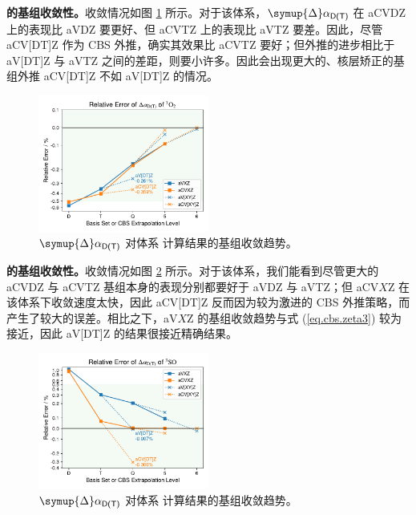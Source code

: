 \textbf{ 的基组收敛性。}收敛情况如图 \ref{fig.O2-iso} 所示。对于该体系，$\symup{\Delta} \alpha_\textsf{D(T)}$ 在 aCVDZ 上的表现比 aVDZ 要更好、但 aCVTZ 上的表现比 aVTZ 要差。因此，尽管 aCV[DT]Z 作为 CBS 外推，确实其效果比 aCVTZ 要好；但外推的进步相比于 aV[DT]Z 与 aVTZ 之间的差距，则要小许多。因此会出现更大的、核层矫正的基组外推 aCV[DT]Z 不如 aV[DT]Z 的情况。

\begin{figure}[!ht]
    \centering
    \includegraphics[width=0.5\textwidth]{assets/O2-iso.pdf}
    \caption[$\symup{\Delta} \alpha_\textsf{D(T)}$ 对体系  计算结果的基组收敛趋势]{$\symup{\Delta} \alpha_\textsf{D(T)}$ 对体系  计算结果的基组收敛趋势。}
    \label{fig.O2-iso}
\end{figure}

\textbf{ 的基组收敛性。}收敛情况如图 \ref{fig.SO-iso} 所示。对于该体系，我们能看到尽管更大的 aCVDZ 与 aCVTZ 基组本身的表现分别都要好于 aVDZ 与 aVTZ；但 aCV$X$Z 在该体系下收敛速度太快，因此 aCV[DT]Z 反而因为较为激进的 CBS 外推策略，而产生了较大的误差。相比之下，aV$X$Z 的基组收敛趋势与式 (\ref{eq.cbs.zeta3}) 较为接近，因此 aV[DT]Z 的结果很接近精确结果。

\begin{figure}[!ht]
    \centering
    \includegraphics[width=0.5\textwidth]{assets/SO-iso.pdf}
    \caption[$\symup{\Delta} \alpha_\textsf{D(T)}$ 对体系  计算结果的基组收敛趋势]{$\symup{\Delta} \alpha_\textsf{D(T)}$ 对体系  计算结果的基组收敛趋势。}
    \label{fig.SO-iso}
\end{figure}

